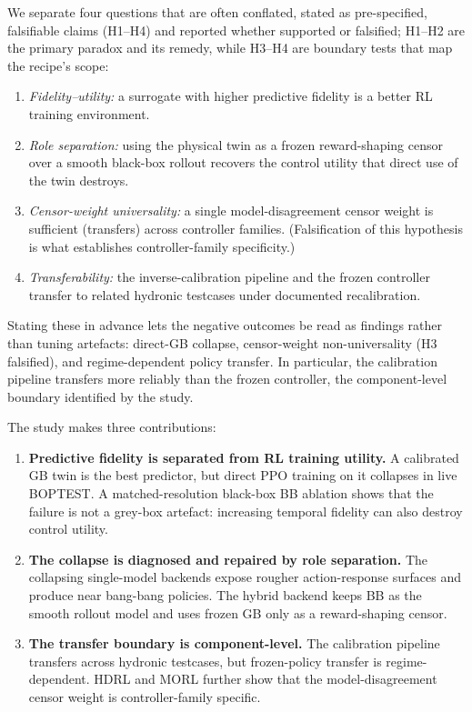 We separate four questions that are often conflated, stated as pre-specified, falsifiable claims (H1--H4) and reported whether supported or falsified; H1--H2 are the primary paradox and its remedy, while H3--H4 are boundary tests that map the recipe's scope:
\begin{enumerate}[label=\textbf{H\arabic*.},leftmargin=2.6em]
 \item \emph{Fidelity--utility:} a surrogate with higher predictive fidelity is a better RL training environment.
 \item \emph{Role separation:} using the physical twin as a frozen reward-shaping censor over a smooth black-box rollout recovers the control utility that direct use of the twin destroys.
 \item \emph{Censor-weight universality:} a single model-disagreement censor weight is sufficient (transfers) across controller families. (Falsification of this hypothesis is what establishes controller-family specificity.)
 \item \emph{Transferability:} the inverse-calibration pipeline and the frozen controller transfer to related hydronic testcases under documented recalibration.
\end{enumerate}
Stating these in advance lets the negative outcomes be read as findings rather than tuning artefacts: direct-GB collapse, censor-weight non-universality (H3 falsified), and regime-dependent policy transfer. In particular, the calibration pipeline transfers more reliably than the frozen controller, the component-level boundary identified by the study.

The study makes three contributions:
\begin{enumerate}
 \item \textbf{Predictive fidelity is separated from RL training utility.} A calibrated GB twin is the best predictor, but direct PPO training on it collapses in live BOPTEST. A matched-resolution black-box BB ablation shows that the failure is not a grey-box artefact: increasing temporal fidelity can also destroy control utility.
 \item \textbf{The collapse is diagnosed and repaired by role separation.} The collapsing single-model backends expose rougher action-response surfaces and produce near bang-bang policies. The hybrid backend keeps BB as the smooth rollout model and uses frozen GB only as a reward-shaping censor.
 \item \textbf{The transfer boundary is component-level.} The calibration pipeline transfers across hydronic testcases, but frozen-policy transfer is regime-dependent. HDRL and MORL further show that the model-disagreement censor weight is controller-family specific.
\end{enumerate}

